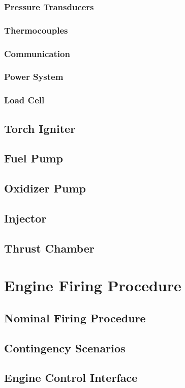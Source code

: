 \documentclass[12pt, letterpaper]{article}
\begin{document}
\subsubsection{Pressure Transducers}
\subsubsection{Thermocouples}
\subsubsection{Communication}
\subsubsection{Power System}
\subsubsection{Load Cell}
\subsection{Torch Igniter}
\subsection{Fuel Pump}
\subsection{Oxidizer Pump}
\subsection{Injector}
\subsection{Thrust Chamber}

\section{Engine Firing Procedure}
\subsection{Nominal Firing Procedure}
\subsection{Contingency Scenarios}
\subsection{Engine Control Interface}
\end{document}
